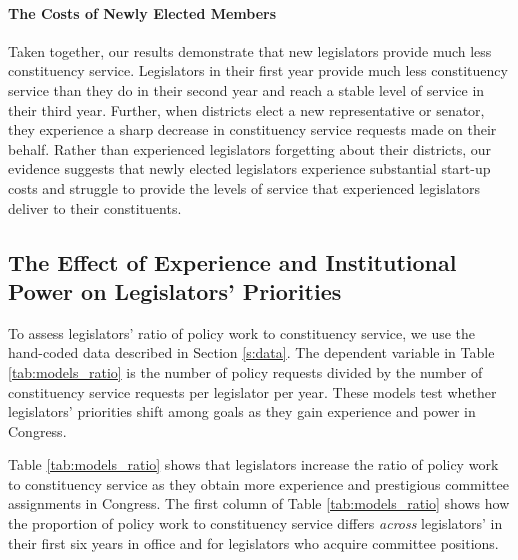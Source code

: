 \documentclass[12pt]{article}
\begin{document}
\paragraph{The Costs of Newly Elected Members} Taken together, our results demonstrate that new legislators provide much less constituency service. Legislators in their first year provide much less constituency service than they do in their second year and reach a stable level of service in their third year. Further, when districts elect a new representative or senator, they experience a sharp decrease in constituency service requests made on their behalf. Rather than experienced legislators forgetting about their districts, our evidence suggests that newly elected legislators experience substantial start-up costs and struggle to provide the levels of service that experienced legislators deliver to their constituents.  


\subsection{The Effect of Experience and Institutional Power on Legislators' Priorities}\label{s:priority} 
To assess legislators' ratio of policy work to constituency service, we use the hand-coded data described in Section \ref{s:data}. The dependent variable in Table \ref{tab:models_ratio} is the number of policy requests divided by the number of constituency service requests per legislator per year. These models test whether legislators' priorities shift among goals as they gain experience and power in Congress.




% 


Table \ref{tab:models_ratio} shows that legislators increase the ratio of policy work to constituency service as they obtain more experience and prestigious committee assignments in Congress. The first column of Table \ref{tab:models_ratio} shows how the proportion of policy work to constituency service differs \textit{across} legislators' in their first six years in office and for legislators who acquire committee positions. 
\end{document}
